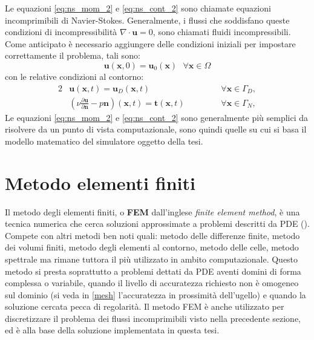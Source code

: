     Le equazioni \eqref{eq:ns_mom_2} e \eqref{eq:ns_cont_2} sono chiamate equazioni incomprimibili di Navier-Stokes.
    Generalmente, i flussi che soddisfano queste condizioni di incompressibilità $\nabla \cdot \boldsymbol{u} = 0$, sono chiamati fluidi incompressibili.
    Come anticipato è necessario aggiungere delle condizioni iniziali per impostare correttamente il problema, tali sono:
    \begin{equation}
        \label{eq:ns_init}
        \boldsymbol{u}\left(\boldsymbol{x},0 \right) = \boldsymbol{u}_0\left(\boldsymbol{x} \right) \,\,\,\, \forall \boldsymbol{x} \in \Omega
    \end{equation}
    con le relative condizioni al contorno:
    \begin{alignat}{2}
        &\boldsymbol{u}\left(\boldsymbol{x},t \right) = \boldsymbol{u}_D\left(\boldsymbol{x},t \right) \label{eq:ns_bound_1}\,\,\,\, &&\forall \boldsymbol{x} \in \Gamma_D, \\
        &\left(\nu \frac{\partial \boldsymbol{u}}{\partial \boldsymbol{n}} - p \boldsymbol{n} \right)\left(\boldsymbol{x},t \right) = \boldsymbol{t}\left(\boldsymbol{x},t \right) \label{eq:ns_bound_2}\,\,\,\, \qquad &&\forall \boldsymbol{x} \in \Gamma_N,
    \end{alignat}
    Le equazioni \eqref{eq:ns_mom_2} e \eqref{eq:ns_cont_2} sono generalmente più semplici da risolvere da un punto di vista computazionale, sono quindi quelle su cui si basa
    il modello matematico del simulatore oggetto della tesi.

\section{Metodo elementi finiti}\label{fem}
Il metodo degli elementi finiti, o \textbf{FEM} dall'inglese \textit{finite element method}, è una tecnica numerica
che cerca soluzioni approssimate a problemi descritti da PDE (\label{PDE}).
Compete con altri metodi ben noti quali: metodo delle differenze finite, metodo dei volumi finiti, metodo degli elementi al contorno,
metodo delle celle, metodo spettrale ma rimane tuttora il più utilizzato in ambito computazionale.
Questo metodo si presta soprattutto a problemi dettati da PDE aventi domini di forma complessa o variabile, quando il livello di accuratezza
richiesto non è omogeneo sul dominio (si veda in \ref{mesh} l'accuratezza in prossimità dell'ugello) e quando la soluzione cercata pecca di regolarità.
Il metodo FEM è anche utilizzato per discretizzare il problema dei flussi incomprimibili visto nella precedente sezione, ed è alla base della soluzione implementata in questa tesi.

